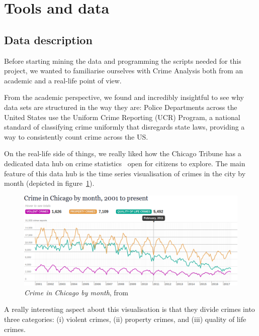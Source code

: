 \section{Tools and data}

\subsection{Data description}

Before starting mining the data and programming the scripts needed for this project, we wanted to familiarise ourselves with Crime Analysis both from an academic and a real-life point of view.

From the academic perspective, we found \cite{Boba2004} and \cite{Beardsley2014} incredibly insightful to see why data sets are structured in the way they are: Police Departments across the United States use the Uniform Crime Reporting (UCR) Program, a national standard of classifying crime uniformly that disregards state laws, providing a way to consistently count crime across the US.

On the real-life side of things, we really liked how the Chicago Tribune has a dedicated data hub on crime statistics~\cite{o:chiago-tribune} open for citizens to explore. The main feature of this data hub is the time series visualisation of crimes in the city by month (depicted in figure~\ref{fig:tribune}).

\begin{figure}[H]
	\centering
	\includegraphics[width=\textwidth]{images/tribune}
	\caption{\emph{Crime in Chicago by month}, from \cite{o:chiago-tribune}}
	\label{fig:tribune}
\end{figure}

A really interesting aspect about this visualisation is that they divide crimes into three categories: (i) violent crimes, (ii) property crimes, and (iii) quality of life crimes.

